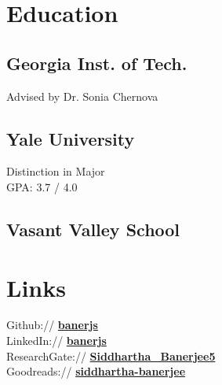 \documentclass[]{deedy-resume}
\begin{document}
%
%
\lastupdated

%
%

%
%

\begin{minipage}[t]{0.33\textwidth}


\section{Education}

\subsection{Georgia Inst. of Tech.}
Advised by Dr. Sonia Chernova
\sectionsep

\subsection{Yale University}
Distinction in Major \\
GPA: 3.7 / 4.0
\sectionsep

\subsection{Vasant Valley School}


\section{Links}
Github:// \href{https://github.com/banerjs}{\bf banerjs} \\
LinkedIn://  \href{https://www.linkedin.com/in/banerjs}{\bf banerjs} \\
ResearchGate://  \href{https://www.researchgate.net/profile/Siddhartha\_Banerjee5}{\bf Siddhartha\_Banerjee5} \\
Goodreads:// \href{https://www.goodreads.com/user/show/41408373-siddhartha-banerjee}{\bf siddhartha-banerjee}


\end{minipage}
\end{document}
